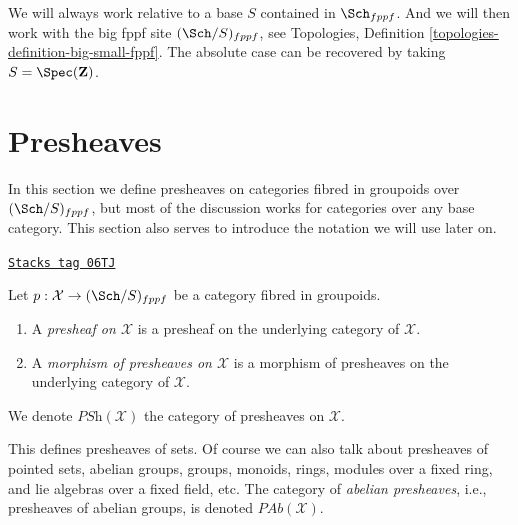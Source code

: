 \medskip\noindent
We will always work relative to a base $S$ contained in $\Sch_{fppf}$.
And we will then work with the big fppf site $(\Sch/S)_{fppf}$, see
Topologies, Definition \ref{topologies-definition-big-small-fppf}.
The absolute case can be recovered by taking
$S = \Spec(\mathbf{Z})$.

\section{Presheaves}
\label{stacks-sheaves-section-presheaves}
In this section we define presheaves on categories fibred in groupoids
over $(\Sch/S)_{fppf}$, but most of the discussion works
for categories over any base category. This section also serves to
introduce the notation we will use later on.

\begin{definition}[Presheaves]
\label{stacks-sheaves-definition-presheaves}
\href{https://stacks.math.columbia.edu/tag/06TJ}{\texttt{Stacks tag 06TJ}}

Let $p : \mathcal{X} \to (\Sch/S)_{fppf}$ be a category fibred in
groupoids.
\begin{enumerate}
\item A {\it presheaf on $\mathcal{X}$} is a presheaf on the
underlying category of $\mathcal{X}$.
\item A {\it morphism of presheaves on $\mathcal{X}$} is a morphism of
presheaves on the underlying category of $\mathcal{X}$.
\end{enumerate}
We denote $\textit{PSh}(\mathcal{X})$ the category of presheaves on
$\mathcal{X}$.
\end{definition}

This defines presheaves of sets. Of course we can also talk about
presheaves of pointed sets, abelian groups, groups, monoids, rings,
modules over a fixed ring, and lie algebras over a fixed field, etc.
The category of {\it abelian presheaves}, i.e., presheaves of abelian
groups, is denoted $\textit{PAb}(\mathcal{X})$.


